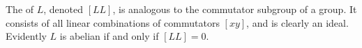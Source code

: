 The  of $L$, denoted $[LL]$, is analogous to the commutator subgroup of a group. It consists of all linear combinations of commutators $[xy]$, and is clearly an ideal. Evidently $L$ is abelian if and only if $[LL] = 0$.
